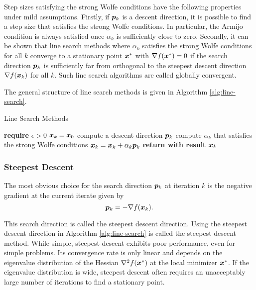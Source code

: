 Step sizes satisfying the strong Wolfe conditions have the following properties under mild assumptions. Firstly, 
if $\bm{p}_k$ is a descent direction, it is possible to find a step size that satisfies the strong Wolfe conditions. In particular,
the Armijo condition is always satisfied once $\alpha_k$ is sufficiently close to zero. Secondly, it 
can be shown that line search methods where $\alpha_k$ satisfies the strong Wolfe conditions for all $k$ converge to a stationary
point $\bm{x}^*$ with $\nabla f(\bm{x}^*) = 0$ if the search direction $\bm{p}_k$ is sufficiently far from orthogonal to the steepest
descent direction $\nabla f(\bm{x}_k)$ for all $k$. Such line search algorithms are called globally convergent.

The general structure of line search methods is given in Algorithm \ref{alg:line-search}.

\begin{algorithm}
\caption{Line Search Methods}\label{alg:line-search}
\begin{algorithmic}
\State \textbf{require } $\epsilon > 0$
\State $\bm{x}_k = \bm{x}_0$
\State compute a descent direction $\bm{p}_k$
\State compute $\alpha_k$ that satisfies the strong Wolfe conditions
\State $\bm{x}_k = \bm{x}_k + \alpha_k \bm{p}_k$
\EndWhile
\State \textbf{return with result } $\bm{x}_k$
\EndProcedure
\end{algorithmic}
\end{algorithm}

\subsubsection{Steepest Descent}\label{sss:steepest-descent}
The most obvious choice for the search direction $\bm{p}_k$ at iteration $k$ is the negative gradient at the current iterate given by 
\[
    \bm{p}_k = -\nabla f(\bm{x}_k).
\]

\noindent This search direction is called the steepest descent direction. Using the steepest descent direction in Algorithm \ref{alg:line-search} 
is called the steepest descent method. While simple, steepest descent exhibits poor performance, even for simple problems. 
Its convergence rate is only linear and depends on the eigenvalue distribution of the Hessian $\nabla^2 f(\bm{x}^*)$ at the local minimizer
$\bm{x}^*$. If the eigenvalue distribution is wide, steepest descent often requires an unacceptably large number of iterations to find a 
stationary point.

